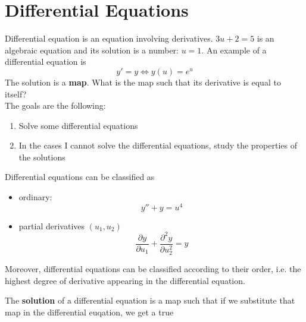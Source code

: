 \chapter{Differential Equations}

Differential equation is an equation involving derivatives. 
$3u+2=5$ is an algebraic equation and its solution is a number: $u=1$.
An example of a differential equation is
\begin{equation*}
    y' = y\Leftrightarrow y(u)=e^u
\end{equation*}
The solution is a \textbf{map}. What is the map such that its derivative is equal to itself?\\

The goals are the following:
\begin{enumerate}
    \item Solve some differential equations
    \item In the cases I cannot solve the differential equations, study the properties of the solutions
\end{enumerate}

Differential equations can be classified as
\begin{itemize}
    \item ordinary:\\
    \begin{equation*}
        y''+y=u^4
    \end{equation*}
    \item partial derivatives $(u_1, u_2)$
    \begin{equation*}
        \frac{\partial y}{\partial u_1} + \frac{\partial^2 y}{\partial u_2^2} = y
    \end{equation*}
\end{itemize}

Moreover, differential equations can be classified according to their order, i.e. the highest degree of derivative appearing in the differential equation.


The \textbf{solution} of a differential equation is a map such that if we substitute that map in the differential euqation,
we get a true 

